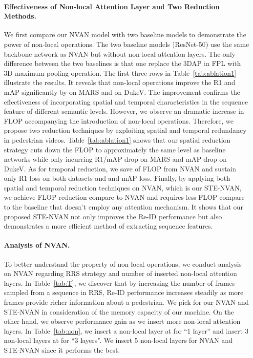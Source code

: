\documentclass{bmvc2k}
\begin{document}
\paragraph{Effectiveness of Non-local Attention Layer and Two Reduction Methods.}
We first compare our NVAN model with two baseline models to demonstrate the power of non-local operations. 
The two baseline models (ResNet-50) use the same backbone network as NVAN but without non-local attention layers.
The only difference between the two baselines is that one replace the 3DAP in FPL with 3D maximum pooling operation.
The first three rows in Table~\ref{tab:ablation1} illustrate the results. 
It reveals that non-local operations improve the R1 and mAP significantly by  on MARS and  on DukeV.
The improvement confirms the effectiveness of incorporating spatial and temporal characteristics in the sequence feature of different semantic levels.
However, we observe an dramatic  increase in FLOP accompanying the introduction of non-local operations.
Therefore, we propose two reduction techniques by exploiting spatial and temporal redundancy in pedestrian videos.
Table~\ref{tab:ablation1} shows that our spatial reduction strategy cuts down the FLOP to approximately the same level as baseline networks while only incurring  R1/mAP drop on MARS and  mAP drop on DukeV.
As for temporal reduction, we save  of FLOP from NVAN and sustain only  R1 loss on both datasets and  and  mAP loss.
Finally, by applying both spatial and temporal reduction techniques on NVAN, which is our STE-NVAN, we achieve  FLOP reduction compare to NVAN and requires  less FLOP compare to the baseline that doesn't employ any attention mechanism.
It shows that our proposed STE-NVAN not only improves the Re-ID performance but also demonstrates a more efficient method of extracting sequence features.

\vspace{-3mm}
\paragraph{Analysis of NVAN.}
To better understand the property of non-local operations, we conduct analysis on NVAN regarding RRS strategy and number of inserted non-local attention layers.
In Table~\ref{tab:T}, we discover that by increasing the number of frames  sampled from a sequence in RRS, Re-ID performance increases steadily as more frames provide richer information about a pedestrian.
We pick  for our NVAN and STE-NVAN in consideration of the memory capacity of our machine.
On the other hand, we observe performance gain as we insert more non-local attention layers.
In Table~\ref{tab:non}, we insert a non-local layer at  for ``1 layer'' and insert 3 non-local layers at  for ``3 layers''.
We insert 5 non-local layers for NVAN and STE-NVAN since it performs the best.
\end{document}
